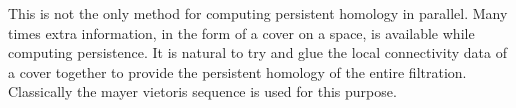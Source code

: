 
This is not the only method for computing persistent homology in parallel. Many times extra information, in the form of a cover on a space, is available while computing persistence. It is natural to try and glue the local connectivity data of a cover together to provide the persistent homology of the entire filtration. Classically the mayer vietoris sequence is used for this purpose.
  